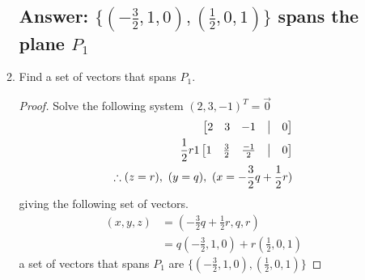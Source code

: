 \documentclass[12pt]{article}
\begin{document}
\begin{enumerate}
\begin{enumerate}
                      \subsection{Answer: $\{(-\frac{3}{2}, 1, 0), (\frac{1}{2}, 0, 1)\}$ spans the plane $P_1$}
                      \item Find a set of vectors that spans $P_1$.
                            \begin{proof}
                                    Solve the following system $(2, 3, -1)^{T} = \vec{0}$
                                    \begin{align*}
                                            \begin{bmatrix}
                                                    2 & 3 & -1 & \bigm| & 0 \\
                                            \end{bmatrix}
                                            \\ \frac{1}{2} r1
                                            \begin{bmatrix}
                                                    1 & \frac{3}{2} & \frac{-1}{2} & \bigm| & 0 \\
                                            \end{bmatrix}
                                            \\
                                            \therefore (z=r),\ (y=q),\ (x=-\frac{3}{2}q+\frac{1}{2}r)
                                    \end{align*}
                                    giving the following set of vectors.
                                    \begin{align*}
                                            (x,y,z) & = (-\frac{3}{2}q+\frac{1}{2}r, q, r)           \\
                                                    & = q(-\frac{3}{2}, 1, 0) + r(\frac{1}{2}, 0, 1)
                                    \end{align*}
                                    a set of vectors that spans $P_1$ are $\{(-\frac{3}{2}, 1, 0), (\frac{1}{2}, 0, 1)\}$
                            \end{proof}

\end{enumerate}
\end{enumerate}
\end{document}
